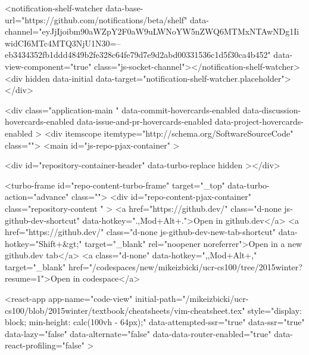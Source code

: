     
  <notification-shelf-watcher data-base-url="https://github.com/notifications/beta/shelf" data-channel="eyJjIjoibm90aWZpY2F0aW9uLWNoYW5nZWQ6MTMxNTAwNDg1IiwidCI6MTc4MTQ3NjU1N30=--eb3434352fb1ddd4849b2fe328c64fe79d7e9d2abd00331536c1d5f30ca4b452" data-view-component="true" class="js-socket-channel"></notification-shelf-watcher>
  <div hidden data-initial data-target="notification-shelf-watcher.placeholder"></div>






  <div
    class="application-main "
    data-commit-hovercards-enabled
    data-discussion-hovercards-enabled
    data-issue-and-pr-hovercards-enabled
    data-project-hovercards-enabled
  >
        <div itemscope itemtype="http://schema.org/SoftwareSourceCode" class="">
    <main id="js-repo-pjax-container" >
      
      







    
  <div id="repository-container-header" data-turbo-replace hidden ></div>



<turbo-frame id="repo-content-turbo-frame" target="_top" data-turbo-action="advance" class="">
    <div id="repo-content-pjax-container" class="repository-content " >
      <a href="https://github.dev/" class="d-none js-github-dev-shortcut" data-hotkey=".,Mod+Alt+.">Open in github.dev</a>
  <a href="https://github.dev/" class="d-none js-github-dev-new-tab-shortcut" data-hotkey="Shift+&gt;" target="_blank" rel="noopener noreferrer">Open in a new github.dev tab</a>
    <a class="d-none" data-hotkey=",,Mod+Alt+," target="_blank" href="/codespaces/new/mikeizbicki/ucr-cs100/tree/2015winter?resume=1">Open in codespace</a>




    
      
    








<react-app
  app-name="code-view"
  initial-path="/mikeizbicki/ucr-cs100/blob/2015winter/textbook/cheatsheets/vim-cheatsheet.tex"
  style="display: block; min-height: calc(100vh - 64px);"
  data-attempted-ssr="true"
  data-ssr="true"
  data-lazy="false"
  data-alternate="false"
  data-data-router-enabled="true"
  data-react-profiling="false"
>
  
